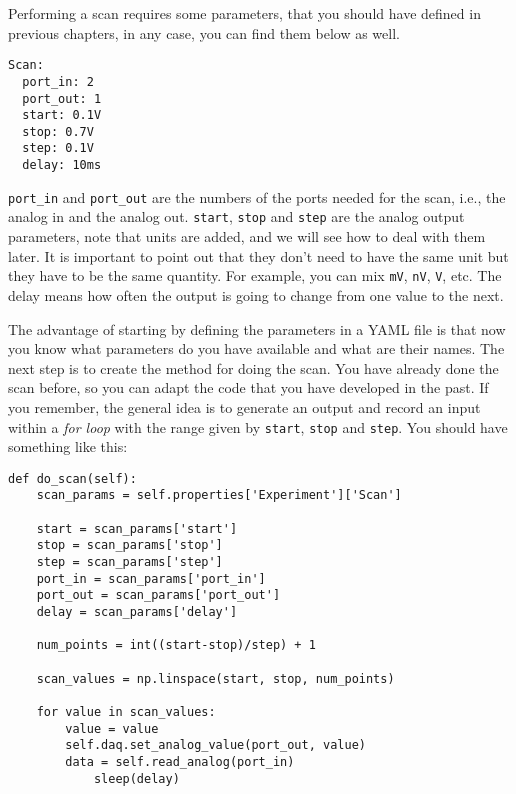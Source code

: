 {

Performing a scan requires some parameters, that you should have defined
in previous chapters, in any case, you can find them below as well.

\begin{verbatim}
Scan:
  port_in: 2
  port_out: 1
  start: 0.1V
  stop: 0.7V
  step: 0.1V
  delay: 10ms
\end{verbatim}

\texttt{port_in} and \texttt{port_out} are the numbers of the ports
needed for the scan, i.e., the analog in and the analog out.
\texttt{start}, \texttt{stop} and \texttt{step} are the analog output
parameters, note that units are added, and we will see how to deal with
them later. It is important to point out that they don't need to have
the same unit but they have to be the same quantity. For example, you
can mix \texttt{mV}, \texttt{nV}, \texttt{V}, etc. The delay means how
often the output is going to change from one value to the next.

The advantage of starting by defining the parameters in a {YAML} file is
that now you know what parameters do you have available and what are
their names. The next step is to create the method for doing the scan.
You have already done the scan before, so you can adapt the code that
you have developed in the past. If you remember, the general idea is to
generate an output and record an input within a \emph{for loop} with the
range given by \texttt{start}, \texttt{stop} and \texttt{step}. You
should have something like this:

\begin{verbatim}
def do_scan(self):
    scan_params = self.properties['Experiment']['Scan']
    
    start = scan_params['start']
    stop = scan_params['stop']
    step = scan_params['step']
    port_in = scan_params['port_in']
    port_out = scan_params['port_out']
    delay = scan_params['delay']

    num_points = int((start-stop)/step) + 1

    scan_values = np.linspace(start, stop, num_points)

    for value in scan_values:
        value = value
        self.daq.set_analog_value(port_out, value)
        data = self.read_analog(port_in)
            sleep(delay)
\end{verbatim}

}
